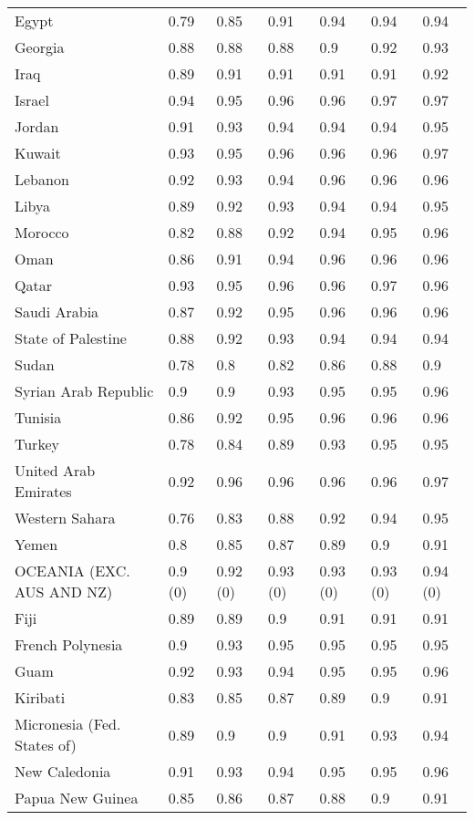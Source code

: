 \begin{longtable}[t]{lllllll}
Egypt & 0.79 & 0.85 & 0.91 & 0.94 & 0.94 & 0.94\\
Georgia & 0.88 & 0.88 & 0.88 & 0.9 & 0.92 & 0.93\\
Iraq & 0.89 & 0.91 & 0.91 & 0.91 & 0.91 & 0.92\\
Israel & 0.94 & 0.95 & 0.96 & 0.96 & 0.97 & 0.97\\
Jordan & 0.91 & 0.93 & 0.94 & 0.94 & 0.94 & 0.95\\
Kuwait & 0.93 & 0.95 & 0.96 & 0.96 & 0.96 & 0.97\\
Lebanon & 0.92 & 0.93 & 0.94 & 0.96 & 0.96 & 0.96\\
Libya & 0.89 & 0.92 & 0.93 & 0.94 & 0.94 & 0.95\\
Morocco & 0.82 & 0.88 & 0.92 & 0.94 & 0.95 & 0.96\\
Oman & 0.86 & 0.91 & 0.94 & 0.96 & 0.96 & 0.96\\
Qatar & 0.93 & 0.95 & 0.96 & 0.96 & 0.97 & 0.96\\
Saudi Arabia & 0.87 & 0.92 & 0.95 & 0.96 & 0.96 & 0.96\\
State of Palestine & 0.88 & 0.92 & 0.93 & 0.94 & 0.94 & 0.94\\
Sudan & 0.78 & 0.8 & 0.82 & 0.86 & 0.88 & 0.9\\
Syrian Arab Republic & 0.9 & 0.9 & 0.93 & 0.95 & 0.95 & 0.96\\
Tunisia & 0.86 & 0.92 & 0.95 & 0.96 & 0.96 & 0.96\\
Turkey & 0.78 & 0.84 & 0.89 & 0.93 & 0.95 & 0.95\\
United Arab Emirates & 0.92 & 0.96 & 0.96 & 0.96 & 0.96 & 0.97\\
Western Sahara & 0.76 & 0.83 & 0.88 & 0.92 & 0.94 & 0.95\\
Yemen & 0.8 & 0.85 & 0.87 & 0.89 & 0.9 & 0.91\\
OCEANIA (EXC. AUS AND NZ) & 0.9 (0) & 0.92 (0) & 0.93 (0) & 0.93 (0) & 0.93 (0) & 0.94 (0)\\
Fiji & 0.89 & 0.89 & 0.9 & 0.91 & 0.91 & 0.91\\
French Polynesia & 0.9 & 0.93 & 0.95 & 0.95 & 0.95 & 0.95\\
Guam & 0.92 & 0.93 & 0.94 & 0.95 & 0.95 & 0.96\\
Kiribati & 0.83 & 0.85 & 0.87 & 0.89 & 0.9 & 0.91\\
Micronesia (Fed. States of) & 0.89 & 0.9 & 0.9 & 0.91 & 0.93 & 0.94\\
New Caledonia & 0.91 & 0.93 & 0.94 & 0.95 & 0.95 & 0.96\\
Papua New Guinea & 0.85 & 0.86 & 0.87 & 0.88 & 0.9 & 0.91\\

\end{longtable}
